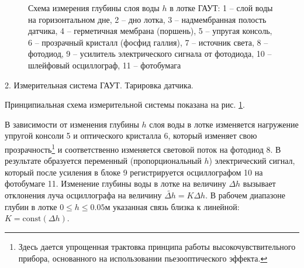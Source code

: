 \documentclass[specialist, subf, href, colorlinks=true, 14pt, final]{disser}
\theoremstyle{definition}
\newcommand{\const}{\text{const}}
\begin{document}
\begin{figure}[!htp]
  \caption{Схема измерения глубины слоя воды $h$ в лотке ГАУТ: 1 -- слой воды на горизонтальном дне, 2 -- дно лотка, 3 -- надмембранная полость датчика, 4 -- герметичная мембрана (поршень), 5 -- упругая консоль, 6 -- прозрачный кристалл (фосфид галлия), 7 -- источник света, 8 -- фотодиод, 9 -- усилитель электрического сигнала от фотодиода, 10 -- шлейфовый осциллограф, 11 -- фотобумага}
  \label{1-4-5}
\end{figure}

2. Измерительная система ГАУТ. Тарировка датчика.

Принципиальная схема измерительной системы показана на рис. \ref{1-4-5}.

В зависимости от изменения глубины $h$ слоя воды в лотке изменяется нагружение упругой консоли 5 и оптического кристалла 6, который изменяет свою прозрачность\footnote{Здесь дается упрощенная трактовка принципа работы высокочувствительного прибора, основанного на использовании пьезооптического эффекта.} и соответственно изменяется световой поток на фотодиод 8. В результате образуется переменный (пропорциональный $h$) электрический сигнал, который после усиления в блоке 9 регистрируется осциллографом 10 на фотобумаге 11. Изменение глубины воды в лотке на величину $\Delta h$ вызывает отклонения луча осциллографа на величину $\widetilde{\Delta h} = K\Delta h$. В рабочем диапазоне глубин в лотке $0\leqslant h \leqslant 0.05$м указанная связь близка к линейной: $K = \const (\Delta h)$.
\end{document}
